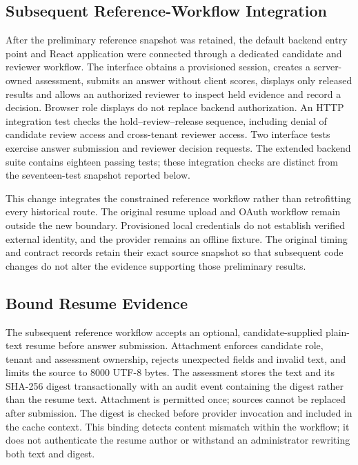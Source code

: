 \documentclass[conference]{IEEEtran}
\begin{document}
\subsection{Subsequent Reference-Workflow Integration}

After the preliminary reference snapshot was retained, the default backend entry point and React application were connected through a dedicated candidate and reviewer workflow. The interface obtains a provisioned session, creates a server-owned assessment, submits an answer without client scores, displays only released results and allows an authorized reviewer to inspect held evidence and record a decision. Browser role displays do not replace backend authorization. An HTTP integration test checks the hold--review--release sequence, including denial of candidate review access and cross-tenant reviewer access. Two interface tests exercise answer submission and reviewer decision requests. The extended backend suite contains eighteen passing tests; these integration checks are distinct from the seventeen-test snapshot reported below.

This change integrates the constrained reference workflow rather than retrofitting every historical route. The original resume upload and OAuth workflow remain outside the new boundary. Provisioned local credentials do not establish verified external identity, and the provider remains an offline fixture. The original timing and contract records retain their exact source snapshot so that subsequent code changes do not alter the evidence supporting those preliminary results.


\subsection{Bound Resume Evidence}

The subsequent reference workflow accepts an optional, candidate-supplied plain-text resume before answer submission. Attachment enforces candidate role, tenant and assessment ownership, rejects unexpected fields and invalid text, and limits the source to 8000 UTF-8 bytes. The assessment stores the text and its SHA-256 digest transactionally with an audit event containing the digest rather than the resume text. Attachment is permitted once; sources cannot be replaced after submission. The digest is checked before provider invocation and included in the cache context. This binding detects content mismatch within the workflow; it does not authenticate the resume author or withstand an administrator rewriting both text and digest.
\end{document}
